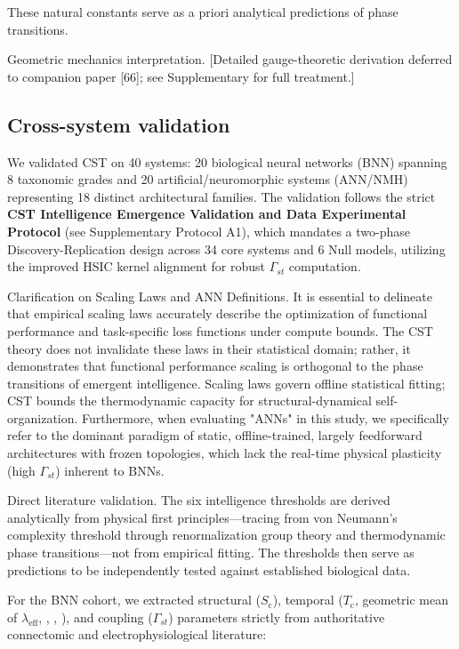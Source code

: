 \documentclass[a4paper,12pt]{article}
\begin{document}
These natural constants serve as a priori analytical predictions of phase transitions.

Geometric mechanics interpretation. [Detailed gauge-theoretic derivation deferred to companion paper [66]; see Supplementary for full treatment.]




\subsection{Cross-system validation}

We validated CST on 40 systems: 20 biological neural networks (BNN) spanning 8 taxonomic grades and 20 artificial/neuromorphic systems (ANN/NMH) representing 18 distinct architectural families. The validation follows the strict \textbf{CST Intelligence Emergence Validation and Data Experimental Protocol} (see Supplementary Protocol A1), which mandates a two-phase Discovery-Replication design across 34 core systems and 6 Null models, utilizing the improved HSIC kernel alignment for robust $\Gamma_{st}$ computation.


Clarification on Scaling Laws and ANN Definitions. It is essential to delineate that empirical scaling laws accurately describe the optimization of functional performance and task-specific loss functions under compute bounds. The CST theory does not invalidate these laws in their statistical domain; rather, it demonstrates that functional performance scaling is orthogonal to the phase transitions of emergent intelligence. Scaling laws govern offline statistical fitting; CST bounds the thermodynamic capacity for structural-dynamical self-organization. Furthermore, when evaluating "ANNs" in this study, we specifically refer to the dominant paradigm of static, offline-trained, largely feedforward architectures with frozen topologies, which lack the real-time physical plasticity (high $\Gamma_{st}$) inherent to BNNs.


Direct literature validation. The six intelligence thresholds are derived analytically from physical first principles---tracing from von Neumann's complexity threshold through renormalization group theory and thermodynamic phase transitions---not from empirical fitting. The thresholds then serve as predictions to be independently tested against established biological data.


For the BNN cohort, we extracted structural ($S_{\text{c}}$), temporal ($T_{\text{c}}$, geometric mean of $\lambda_{\text{eff}}$, \Phi, \Psi, \Theta), and coupling ($\Gamma_{st}$) parameters strictly from authoritative connectomic and electrophysiological literature:
\end{document}
